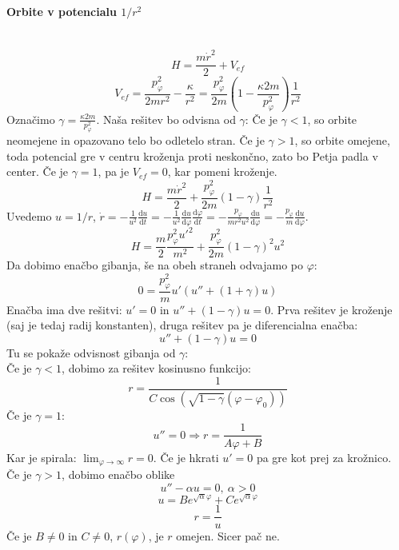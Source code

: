 \documentclass[a4paper]{article}
\newcommand{\dd}[2]{\frac{\mathrm{d} {#1}}{\mathrm{d} {#2}}}
\newcommand{\Lim}[1]{\lim_{{#1} \rightarrow \infty}}
\begin{document}
\paragraph{Orbite v potencialu $1/r^2$} \text{} \\
$$H = \frac{m\dot{r}^2}{2} + V_{ef}$$
$$V_{ef} = \frac{p_\varphi^2}{2mr^2} - \frac{\kappa}{r^2} = \frac{p_\varphi^2}{2m}\left(1 - \frac{\kappa 2m}{p_\varphi^2}\right)\frac{1}{r^2}$$
Označimo $\displaystyle{\gamma = \frac{\kappa 2m}{p_\varphi^2}}$. Naša rešitev bo odvisna od $\gamma$: Če je $\gamma < 1$, so 
orbite neomejene in opazovano telo bo odletelo stran. Če je $\gamma > 1$, so orbite omejene, toda potencial gre v centru kroženja proti neskončno,
zato bo Petja padla v center. Če je $\gamma = 1$, pa je $V_{ef} = 0$, kar pomeni kroženje.
$$H = \frac{m\dot{r}^2}{2} + \frac{p_\varphi^2}{2m}(1 - \gamma)\frac{1}{r^2}$$
Uvedemo $u = 1/r$, $\displaystyle{\dot{r} = -\frac{1}{u^2}\dd{u}{t}} = -\frac{1}{u^2}\dd{u}{\varphi}\dd{\varphi}{t} = -\frac{p_\varphi}{mr^2u^2}\dd{u}{\varphi} = -\frac{p_\varphi}{m}\dd{u}{\varphi}$.
$$H = \frac{m}{2}\frac{p_\varphi^2u'^2}{m^2} + \frac{p_\varphi^2}{2m}\left(1 - \gamma\right)^2u^2$$
Da dobimo enačbo gibanja, še na obeh straneh odvajamo po $\varphi$:
$$0 = \frac{p_\varphi^2}{m}u'\left(u'' + (1+\gamma)u\right)$$
Enačba ima dve rešitvi: $u' = 0$ in $u'' + (1 - \gamma)u = 0$. Prva rešitev je kroženje (saj je tedaj radij konstanten), druga rešitev pa je diferencialna enačba:
$$u'' + (1 - \gamma)u = 0$$
Tu se pokaže odvisnost gibanja od $\gamma$: \\[3mm]
Če je $\gamma < 1$, dobimo za rešitev kosinusno funkcijo:
$$r = \frac{1}{C\cos\left(\sqrt{1-\gamma}(\varphi - \varphi_0)\right)}$$
Če je $\gamma = 1$:
$$u'' = 0 \Rightarrow r = \frac{1}{A\varphi + B}$$
Kar je spirala: $\displaystyle{\Lim{\varphi}r = 0}$. Če je hkrati $u' = 0$ pa gre kot prej za krožnico. \\[3mm]
Če je $\gamma > 1$, dobimo enačbo oblike
$$u'' - \alpha u = 0,~\alpha > 0$$
$$u = Be^{\sqrt{\alpha}\varphi} + Ce^{\sqrt{\alpha}\varphi}$$
$$r = \frac{1}{u}$$
Če je $B \neq 0$ in $C \neq 0$, $r(\varphi)$, je $r$ omejen. Sicer pač ne.
\end{document}
